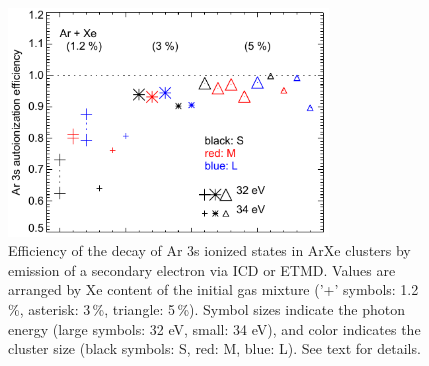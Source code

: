 \begin{figure}[ht]
 \centering
 \includegraphics[width=8.5cm]{pics/figure_eff.pdf}
 \caption{
Efficiency of the decay of Ar 3s ionized states in ArXe clusters by emission of a secondary electron via ICD or ETMD. Values are arranged by Xe content of the initial gas mixture ('+' symbols: 1.2\,\%, asterisk: 3\,\%, triangle: 5\,\%). Symbol sizes indicate the photon energy (large symbols: 32 eV, small: 34 eV), and color indicates the cluster size (black symbols: S, red: M, blue: L). See text for details.
}
 \label{figure:eff}
\end{figure}
